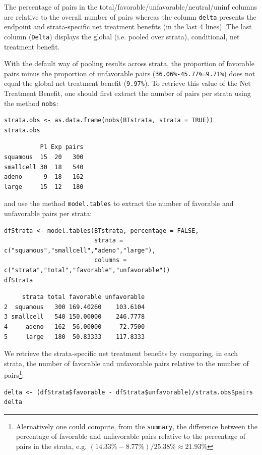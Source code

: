 \documentclass[12pt]{article}
\newcommand\Warning[1][3ex]{%
\renewcommand\stacktype{L}%
\scaleto{\stackon[1.3pt]{\color{red}$\triangle$}{\tiny\bfseries !}}{#1}%
\xspace
}
\begin{document}
The percentage of pairs in the
total/favorable/unfavorable/neutral/uninf columns are relative to the
overall number of pairs whereas the column \texttt{delta} presents the
endpoint and strata-specific net treatment benefits (in the last 4
lines). The last column (\texttt{Delta}) displays the global (i.e. pooled
over strata), conditional, net treatment benefit. \newline \Warning
With the default way of pooling results across strata, the proportion
of favorable pairs minus the proportion of unfavorable pairs
(\texttt{36.06\%-45.77\%=9.71\%}) does not equal the global net treatment
benefit (\texttt{9.97\%}). To retrieve this value of the Net Treatment
Benefit, one should first extract the number of pairs per strata using
the method \texttt{nobs}:
\lstset{language=r,label= ,caption= ,captionpos=b,numbers=none}
\begin{lstlisting}
strata.obs <- as.data.frame(nobs(BTstrata, strata = TRUE))
strata.obs
\end{lstlisting}

\begin{verbatim}
          Pl Exp pairs
squamous  15  20   300
smallcell 30  18   540
adeno      9  18   162
large     15  12   180
\end{verbatim}


and use the method \texttt{model.tables} to extract the number of favorable and unfavorable
pairs per strata:
\lstset{language=r,label= ,caption= ,captionpos=b,numbers=none}
\begin{lstlisting}
dfStrata <- model.tables(BTstrata, percentage = FALSE,
                         strata = c("squamous","smallcell","adeno","large"),
                         columns = c("strata","total","favorable","unfavorable"))
dfStrata
\end{lstlisting}

\begin{verbatim}
     strata total favorable unfavorable
2  squamous   300 169.40260    103.6104
3 smallcell   540 150.00000    246.7778
4     adeno   162  56.00000     72.7500
5     large   180  50.83333    117.8333
\end{verbatim}


We retrieve the strata-specific net treatment benefits by comparing, in each
strata, the number of favorable and unfavorable pairs relative to the
number of pairs\footnote{Alernatively one could compute, from the \texttt{summary}, the difference
between the percentage of favorable and unfavorable pairs relative to
the percentage of pairs in the strata, e.g. \((14.33\%-8.77\%)/25.38\%
\approx 21.93\%\)}:
\lstset{language=r,label= ,caption= ,captionpos=b,numbers=none}
\begin{lstlisting}
delta <- (dfStrata$favorable - dfStrata$unfavorable)/strata.obs$pairs
delta
\end{lstlisting}
\end{document}
